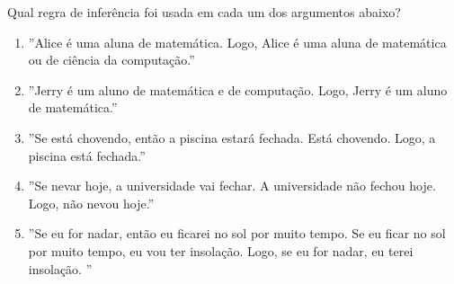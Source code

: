 \item %
	Qual regra de inferência foi usada em cada um dos argumentos abaixo?
	\begin{enumerate}
		\item  ''Alice é uma aluna de matemática. Logo, Alice é uma aluna de matemática ou de ciência da computação.''
		\item ''Jerry é um aluno de matemática e de computação. Logo, Jerry é um aluno de matemática.''
		\item  ''Se está chovendo, então a piscina estará fechada. Está chovendo. Logo, a piscina está fechada.''
		\item ''Se nevar hoje, a universidade vai fechar. A universidade não fechou hoje. Logo, não nevou hoje.''
		\item ''Se eu for nadar, então eu ﬁcarei no sol por muito tempo. Se eu ﬁcar no sol por muito tempo, eu vou ter insolação. Logo, se eu for nadar, eu terei insolação. ''
	\end{enumerate}
